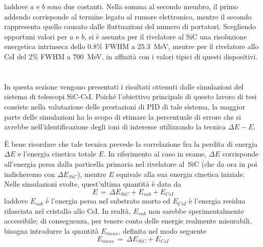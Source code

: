laddove $a$ e $b$ sono due costanti.
Nella somma al secondo membro, il primo addendo corrisponde al termine legato al rumore elettronico, mentre il secondo rappresenta quello causato dalle fluttuazioni del numero di portatori.
%
%
Scegliendo opportuni valori per $a$ e $b$, si è assunta per il rivelatore al SiC una risoluzione energetica intrinseca dello 0.8\% FWHM a 25.3~MeV, mentre per il rivelatore allo CsI del 2\% FWHM a 700~MeV, in affinità con i valori tipici di questi dispositivi. 









\section{}

In questa sezione vengono presentati i risultati ottenuti dalle simulazioni \geant{} del sistema di telescopi SiC-CsI.
Poiché l'obiettivo principale di questo lavoro di tesi consiste nella valutazione delle prestazioni di PID di tale sistema, la maggior parte delle simulazioni ha lo scopo di stimare la percentuale di errore che si avrebbe nell'identificazione degli ioni di interesse utilizzando la tecnica $\Delta E - E$.

È bene ricordare che tale tecnica prevede la correlazione fra la perdita di energia $\Delta E$ e l'energia cinetica totale $E$. In riferimento al caso in esame, $\Delta E$ corrisponde all'energia persa dalla particella primaria nel rivelatore al~SiC (che da ora in poi indicheremo con $ \Delta E_{SiC}$), mentre $E$ equivale alla sua energia cinetica iniziale. Nelle simulazioni svolte, quest'ultima quantità è data da
\begin{equation}
	E \, = \, \Delta E_{SiC} + E_{sub} + E_{CsI}
\end{equation}
laddove $E_{sub}$ è l'energia persa nel substrato morto ed $E_{CsI}$ è l'energia residua rilasciata nel cristallo allo CsI.
In realtà, $E_{sub}$ non sarebbe sperimentalmente accessibile; di conseguenza, per tenere conto delle energie realmente misurabili, bisogna introdurre la quantità $E_{meas}$, definita nel modo seguente
\begin{equation}
	E_{meas} \, = \, \Delta E_{SiC} + E_{CsI}
\end{equation}

